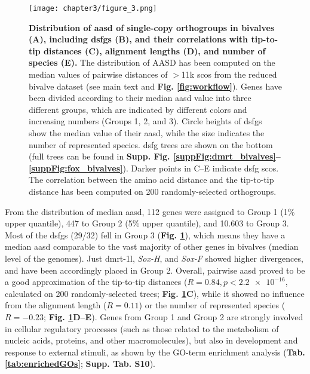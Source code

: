 \documentclass[../main.tex]{subfiles}
\begin{document}
\begin{figure}
	\centering
	\texttt{[image: chapter3/figure\_3.png]}
	\captionsetup{width=\textwidth}
	\caption{
		\textbf{Distribution of \gls{aasd} of single-copy orthogroups in bivalves (A), including \glspl{dsfg} (B), and their correlations with tip-to-tip distances (C), alignment lengths (D), and number of species (E).} The distribution of AASD has been computed on the median values of pairwise distances of $>$11k \glspl{sco} from the reduced bivalve dataset (see main text and \textbf{Fig. \ref{fig:workflow}}). Genes have been divided according to their median \gls{aasd} value into three different groups, which are indicated by different colors and increasing numbers (Groups 1, 2, and 3). Circle heights of \glspl{dsfg} show the median value of their \gls{aasd}, while the size indicates the number of represented species. \gls{dsfg} trees are shown on the bottom (full trees can be found in \textbf{Supp. Fig. \ref{suppFig:dmrt_bivalves}--\ref{suppFig:fox_bivalves}}). Darker points in C--E indicate \gls{dsfg} \glspl{sco}. The correlation between the amino acid distance and the tip-to-tip distance has been computed on 200 randomly-selected orthogroups.
	}
	\label{fig:DSFG_bivalveDivergence}
\end{figure}

From the distribution of median \gls{aasd}, 112 genes were assigned to Group 1 (1\% upper quantile), 447 to Group 2 (5\% upper quantile), and 10.603 to Group 3. Most of the \glspl{dsfg} (29/32) fell in Group 3 (\textbf{Fig. \ref{fig:DSFG_bivalveDivergence}}), which means they have a median \gls{aasd} comparable to the vast majority of other genes in bivalves (median level of the genomes). Just \gls{dmrt-1l}, \textit{Sox-H}, and \textit{Sox-F} showed higher divergences, and have been accordingly placed in Group 2. Overall, pairwise \gls{aasd} proved to be a good approximation of the tip-to-tip distances ($R = 0.84, p < \num{2.2e-16}$, calculated on 200 randomly-selected trees; \textbf{Fig. \ref{fig:DSFG_bivalveDivergence}C}), while it showed no influence from the alignment length ($R = 0.11$) or the number of represented species ($R = -0.23$; \textbf{Fig. \ref{fig:DSFG_bivalveDivergence}D--E}). Genes from Group 1 and Group 2 are strongly involved in cellular regulatory processes (such as those related to the metabolism of nucleic acids, proteins, and other macromolecules), but also in development and response to external stimuli, as shown by the GO-term enrichment analysis (\textbf{Tab. \ref{tab:enrichedGOs}}; \textbf{Supp. Tab. S10}).
\end{document}
